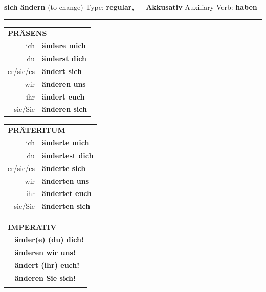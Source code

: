 \documentclass[10pt,a4paper]{revtex4-2}
\begin{document}
\begin{verbbox-acc}
        {\Large \bf sich ändern} (to change) \hfill Type: \textbf{regular, + Akkusativ} \hfill Auxiliary Verb: \textbf{haben} 
    
       \vspace{5pt}

    \hrule
    
    \vspace{5pt}

  \begin{tabular}{rl}
     \multicolumn{2}{l}{\textbf{PRÄSENS} }\\
    ich & \textbf{ändere mich}\\
    du & \textbf{änderst dich}\\
    er/sie/es & \textbf{ändert sich}\\
    wir & \textbf{änderen uns}\\
    ihr & \textbf{ändert euch}\\
    sie/Sie & \textbf{änderen sich}\\
  \end{tabular}
  \hfill
     \begin{tabular}{rl}
    \multicolumn{2}{l}{\textbf{PRÄTERITUM} }\\
    ich & \textbf{änderte mich}\\
    du & \textbf{ändertest dich}\\
    er/sie/es & \textbf{änderte sich}\\
    wir & \textbf{änderten uns}\\
    ihr & \textbf{ändertet euch}\\
    sie/Sie & \textbf{änderten sich}\\
  \end{tabular}
  \hfill
  \begin{tabular}{rl}
     \multicolumn{2}{l}{\textbf{IMPERATIV} }\\
   & \textbf{änder(e) (du) dich!}\\
   & \textbf{änderen wir uns!}\\
   & \textbf{ändert (ihr) euch!}\\
   & \textbf{änderen Sie sich!}\\
   & \vspace{10pt}
  \end{tabular}

    \vspace{10pt}


\end{verbbox-acc}
\end{document}
